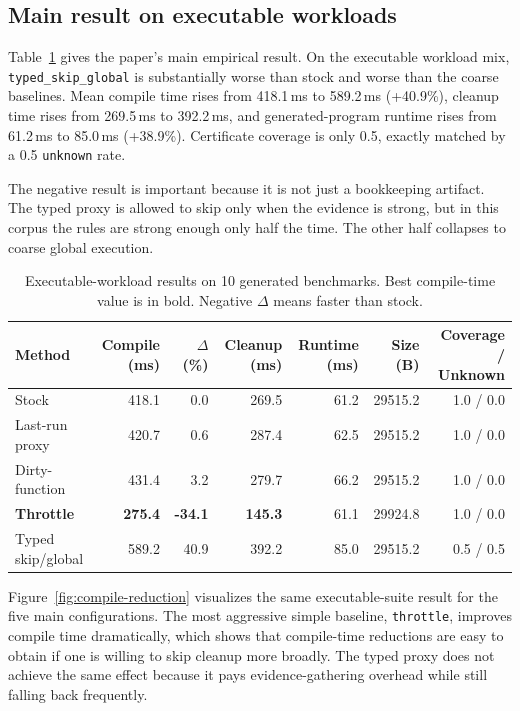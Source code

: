 \documentclass{article}
\begin{document}
\subsection{Main result on executable workloads}

Table~\ref{tab:exec-main} gives the paper's main empirical result. On the executable workload mix, \texttt{typed\_skip\_global} is substantially worse than stock and worse than the coarse baselines. Mean compile time rises from 418.1\,ms to 589.2\,ms (+40.9\%), cleanup time rises from 269.5\,ms to 392.2\,ms, and generated-program runtime rises from 61.2\,ms to 85.0\,ms (+38.9\%). Certificate coverage is only 0.5, exactly matched by a 0.5 \texttt{unknown} rate.

The negative result is important because it is not just a bookkeeping artifact. The typed proxy is allowed to skip only when the evidence is strong, but in this corpus the rules are strong enough only half the time. The other half collapses to coarse global execution.

\begin{table}[t]
\caption{Executable-workload results on 10 generated benchmarks. Best compile-time value is in bold. Negative $\Delta$ means faster than stock.}
\label{tab:exec-main}
\centering
\small
\begin{tabular}{lrrrrrr}
\toprule
Method & Compile (ms) & $\Delta$ (\%) & Cleanup (ms) & Runtime (ms) & Size (B) & Coverage / Unknown \\
\midrule
Stock & 418.1 & 0.0 & 269.5 & 61.2 & 29515.2 & 1.0 / 0.0 \\
Last-run proxy & 420.7 & 0.6 & 287.4 & 62.5 & 29515.2 & 1.0 / 0.0 \\
Dirty-function & 431.4 & 3.2 & 279.7 & 66.2 & 29515.2 & 1.0 / 0.0 \\
\textbf{Throttle} & \textbf{275.4} & \textbf{-34.1} & \textbf{145.3} & 61.1 & 29924.8 & 1.0 / 0.0 \\
Typed skip/global & 589.2 & 40.9 & 392.2 & 85.0 & 29515.2 & 0.5 / 0.5 \\
\bottomrule
\end{tabular}
\end{table}

Figure~\ref{fig:compile-reduction} visualizes the same executable-suite result for the five main configurations. The most aggressive simple baseline, \texttt{throttle}, improves compile time dramatically, which shows that compile-time reductions are easy to obtain if one is willing to skip cleanup more broadly. The typed proxy does not achieve the same effect because it pays evidence-gathering overhead while still falling back frequently.
\end{document}
